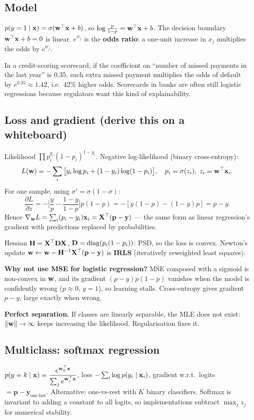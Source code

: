 \subsection{Model}
$p(y=1\mid\mathbf{x})=\sigma(\mathbf{w}^\top\mathbf{x}+b)$, so $\log\frac{p}{1-p}=\mathbf{w}^\top\mathbf{x}+b$. The decision boundary $\mathbf{w}^\top\mathbf{x}+b=0$ is linear. $e^{w_j}$ is the \textbf{odds ratio}: a one-unit increase in $x_j$ multiplies the odds by $e^{w_j}$.

\begin{realworld}
In a credit-scoring scorecard, if the coefficient on ``number of missed payments in the last year'' is $0.35$, each extra missed payment multiplies the odds of default by $e^{0.35}\approx1.42$, i.e.\ 42\% higher odds. Scorecards in banks are often still logistic regressions because regulators want this kind of explainability.
\end{realworld}

\subsection{Loss and gradient (derive this on a whiteboard)}
Likelihood $\prod p_i^{y_i}(1-p_i)^{1-y_i}$. Negative log-likelihood (binary cross-entropy):
\[L(\mathbf{w})=-\sum_i\big[y_i\log p_i+(1-y_i)\log(1-p_i)\big],\quad p_i=\sigma(z_i),\;z_i=\mathbf{w}^\top\mathbf{x}_i.\]
For one sample, using $\sigma'=\sigma(1-\sigma)$:
\[\frac{\partial L}{\partial z}=-\Big[\frac{y}{p}-\frac{1-y}{1-p}\Big]p(1-p)=-[y(1-p)-(1-y)p]=p-y.\]
Hence $\nabla_{\mathbf{w}}L=\sum_i(p_i-y_i)\mathbf{x}_i=\mathbf{X}^\top(\mathbf{p}-\mathbf{y})$ --- the same form as linear regression's gradient with predictions replaced by probabilities.

Hessian $\mathbf{H}=\mathbf{X}^\top\mathbf{D}\mathbf{X}$, $\mathbf{D}=\operatorname{diag}(p_i(1-p_i))$: PSD, so the loss is convex. Newton's update $\mathbf{w}\leftarrow\mathbf{w}-\mathbf{H}^{-1}\mathbf{X}^\top(\mathbf{p}-\mathbf{y})$ is \textbf{IRLS} (iteratively reweighted least squares).

\textbf{Why not use MSE for logistic regression?} MSE composed with a sigmoid is non-convex in $\mathbf{w}$, and its gradient $(p-y)p(1-p)$ vanishes when the model is confidently wrong ($p\approx0$, $y=1$), so learning stalls. Cross-entropy gives gradient $p-y$, large exactly when wrong.

\textbf{Perfect separation.} If classes are linearly separable, the MLE does not exist: $\|\mathbf{w}\|\to\infty$ keeps increasing the likelihood. Regularisation fixes it.

\subsection{Multiclass: softmax regression}
$p(y=k\mid\mathbf{x})=\dfrac{e^{\mathbf{w}_k^\top\mathbf{x}}}{\sum_je^{\mathbf{w}_j^\top\mathbf{x}}}$, loss $-\sum_i\log p(y_i\mid\mathbf{x}_i)$, gradient w.r.t.\ logits $=\mathbf{p}-\mathbf{y}_{\text{one-hot}}$. Alternative: one-vs-rest with $K$ binary classifiers. Softmax is invariant to adding a constant to all logits, so implementations subtract $\max_j z_j$ for numerical stability.

